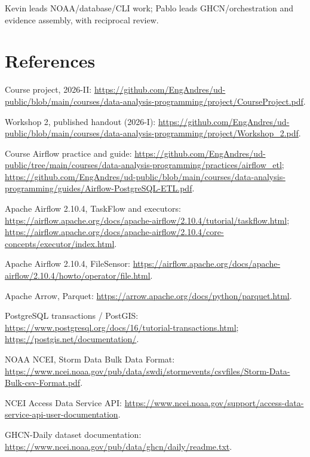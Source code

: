 \documentclass[10pt]{article}
\begin{document}
Kevin leads NOAA/database/CLI work; Pablo leads GHCN/orchestration and evidence
assembly, with reciprocal review.

\section*{References}
\begin{enumerate}[label={[\arabic*]}]
\item Course project, 2026-II:
\url{https://github.com/EngAndres/ud-public/blob/main/courses/data-analysis-programming/project/CourseProject.pdf}.
\item Workshop 2, published handout (2026-I):
\url{https://github.com/EngAndres/ud-public/blob/main/courses/data-analysis-programming/project/Workshop_2.pdf}.
\item Course Airflow practice and guide:
\url{https://github.com/EngAndres/ud-public/tree/main/courses/data-analysis-programming/practices/airflow_etl};
\url{https://github.com/EngAndres/ud-public/blob/main/courses/data-analysis-programming/guides/Airflow-PostgreSQL-ETL.pdf}.
\item Apache Airflow 2.10.4, TaskFlow and executors:
\url{https://airflow.apache.org/docs/apache-airflow/2.10.4/tutorial/taskflow.html};
\url{https://airflow.apache.org/docs/apache-airflow/2.10.4/core-concepts/executor/index.html}.
\item Apache Airflow 2.10.4, FileSensor:
\url{https://airflow.apache.org/docs/apache-airflow/2.10.4/howto/operator/file.html}.
\item Apache Arrow, Parquet:
\url{https://arrow.apache.org/docs/python/parquet.html}.
\item PostgreSQL transactions / PostGIS:
\url{https://www.postgresql.org/docs/16/tutorial-transactions.html};
\url{https://postgis.net/documentation/}.
\item NOAA NCEI, Storm Data Bulk Data Format:
\url{https://www.ncei.noaa.gov/pub/data/swdi/stormevents/csvfiles/Storm-Data-Bulk-csv-Format.pdf}.
\item NCEI Access Data Service API:
\url{https://www.ncei.noaa.gov/support/access-data-service-api-user-documentation}.
\item GHCN-Daily dataset documentation:
\url{https://www.ncei.noaa.gov/pub/data/ghcn/daily/readme.txt}.
\end{enumerate}

\end{document}
